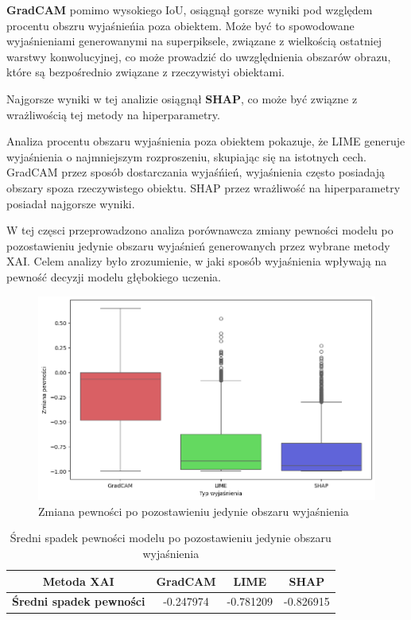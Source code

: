 \textbf{GradCAM} pomimo wysokiego IoU, osiągnął gorsze wyniki pod względem procentu obszru wyjaśnieńia poza obiektem.
Może być to spowodowane wyjaśnieniami generowanymi na superpiksele, związane z wielkością ostatniej warstwy konwolucyjnej, co może prowadzić do uwzględnienia obszarów obrazu, które są bezpośrednio związane z rzeczywistyi obiektami.

Najgorsze wyniki w tej analizie osiągnął \textbf{SHAP}, co może być związne z wrażliwością tej metody na hiperparametry.

Analiza procentu obszaru wyjaśnienia poza obiektem pokazuje, że LIME generuje wyjaśnienia o najmniejszym rozproszeniu, skupiając się na istotnych cech.
GradCAM przez sposób dostarczania wyjaśńień, wyjaśnienia często posiadają obszary spoza rzeczywistego obiektu.
SHAP przez wrażliwość na hiperparametry posiadał najgorsze wyniki.

\vspace{1cm}

W tej częsci przeprowadzono analiza porównawcza zmiany pewności modelu po pozostawieniu jedynie obszaru wyjaśnień generowanych przez wybrane metody XAI. 
Celem analizy było zrozumienie, w jaki sposób wyjaśnienia wpływają na pewność decyzji modelu głębokiego uczenia.

\begin{figure}[h]
	\centering\includegraphics[width=.9\textwidth]{img/base_confidence_exp}
	\caption{Zmiana pewności po pozostawieniu jedynie obszaru wyjaśnienia}  \label{rys:base_confidence_exp}
\end{figure}

\begin{table}[h]
	\centering
	\begin{tabular}{|c|c|c|c|}
		\hline
		\textbf{Metoda XAI}             & \textbf{GradCAM} & \textbf{LIME} & \textbf{SHAP} \\
		\hline
		\textbf{Średni spadek pewności} & -0.247974        & -0.781209     & -0.826915     \\
		\hline
	\end{tabular}
	\caption{Średni spadek pewności modelu po pozostawieniu jedynie obszaru wyjaśnienia}
	\label{tab:base_confidence_exp}
\end{table}

